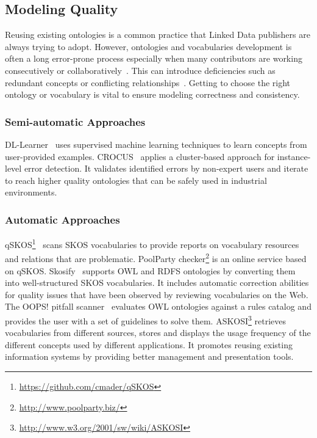 \subsection{Modeling Quality}
Reusing existing ontologies is a common practice that Linked Data publishers are always trying to adopt. However, ontologies and vocabularies development is often a long error-prone process especially when many contributors are working consecutively or collaboratively~\cite{Suominen:DataSemantics:13}. This can introduce deficiencies such as redundant concepts or conflicting relationships~\cite{Harpring:Getty:10}. Getting to choose the right ontology or vocabulary is vital to ensure modeling correctness and consistency.

\subsubsection{Semi-automatic Approaches}
DL-Learner~\cite{Lehmann:MLResearch:09} uses supervised machine learning techniques to learn concepts from user-provided examples. CROCUS~\cite{Cherix:WASABI:14} applies a cluster-based approach for instance-level error detection. It validates identified errors by non-expert users and iterate to reach higher quality ontologies that can be safely used in industrial environments.

\subsubsection{Automatic Approaches}
qSKOS\footnote{\url{https://github.com/cmader/qSKOS}}~\cite{Mader:TBDL:12} scans SKOS vocabularies to provide reports on vocabulary resources and relations that are problematic. PoolParty checker\footnote{\url{http://www.poolparty.biz/}} is an online service based on qSKOS. Skosify~\cite{Suominen:IKEM:12} supports OWL and RDFS ontologies by converting them into well-structured SKOS vocabularies. It includes automatic correction abilities for quality issues that have been observed by reviewing vocabularies on the Web. The OOPS! pitfall scanner~\cite{PovedaVillalon:EKAW:12} evaluates OWL ontologies against a rules catalog and provides the user with a set of guidelines to solve them. ASKOSI\footnote{\url{http://www.w3.org/2001/sw/wiki/ASKOSI}} retrieves vocabularies from different sources, stores and displays the usage frequency of the different concepts used by different applications. It promotes reusing existing information systems by providing better management and presentation tools.

